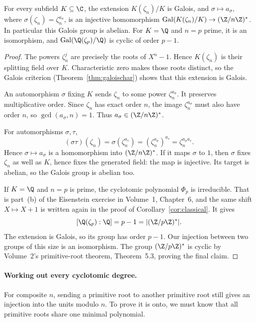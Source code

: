 \begin{proposition}\label{prop:cyclo}
For every subfield $K\subseteq\C$, the extension $K(\zeta_n)/K$ is Galois, and $\sigma\mapsto a_\sigma$, where $\sigma(\zeta_n)=\zeta_n^{a_\sigma}$, is an injective homomorphism $\operatorname{Gal}(K(\zeta_n)/K)\to(\Z/n\Z)^*$. In particular this Galois group is abelian. For $K=\Q$ and $n=p$ prime, it is an isomorphism, and $\operatorname{Gal}(\Q(\zeta_p)/\Q)$ is cyclic of order $p-1$.
\end{proposition}
\begin{proof}
The powers $\zeta_n^j$ are precisely the roots
of $X^n-1$. Hence $K(\zeta_n)$ is their
splitting field over $K$. Characteristic zero
makes those roots distinct, so the Galois
criterion (Theorem~\ref{thm:galoischar})
shows that this extension is Galois.

An automorphism $\sigma$ fixing $K$ sends
$\zeta_n$ to some power $\zeta_n^{a_\sigma}$.
It preserves multiplicative order.
Since $\zeta_n$ has exact order $n$,
the image $\zeta_n^{a_\sigma}$ must
also have order $n$, so
$\gcd(a_\sigma,n)=1$.
Thus $a_\sigma\in(\Z/n\Z)^*$.

For automorphisms $\sigma,\tau$,
\[
(\sigma\tau)(\zeta_n)
=\sigma(\zeta_n^{a_\tau})
=(\zeta_n^{a_\sigma})^{a_\tau}
=\zeta_n^{a_\sigma a_\tau}.
\]
Hence $\sigma\mapsto a_\sigma$ is a
homomorphism into $(\Z/n\Z)^*$.
If it maps $\sigma$ to $1$, then
$\sigma$ fixes $\zeta_n$ as well as
$K$, hence fixes the generated field:
the map is injective.
Its target is abelian, so the
Galois group is abelian too.

If $K=\Q$ and $n=p$ is prime,
the cyclotomic polynomial $\Phi_p$
is irreducible. That is part~(b) of the Eisenstein exercise in Volume~1, Chapter~6, and the same shift $X\mapsto X+1$ is written again in the proof of Corollary~\ref{cor:classical}. It gives
\[
[\Q(\zeta_p):\Q]=p-1=|(\Z/p\Z)^*|.
\]
The extension is Galois, so its
group has order $p-1$.
Our injection between two groups of
this size is an isomorphism.
The group $(\Z/p\Z)^*$ is cyclic
by Volume~2's primitive-root theorem, Theorem~5.3,
proving the final claim.
\end{proof}

\paragraph{Working out every cyclotomic degree.}
For composite $n$, sending a primitive root to another primitive root still gives
an injection into the units modulo $n$. To prove it is onto, we must know that
all primitive roots share one minimal polynomial.

